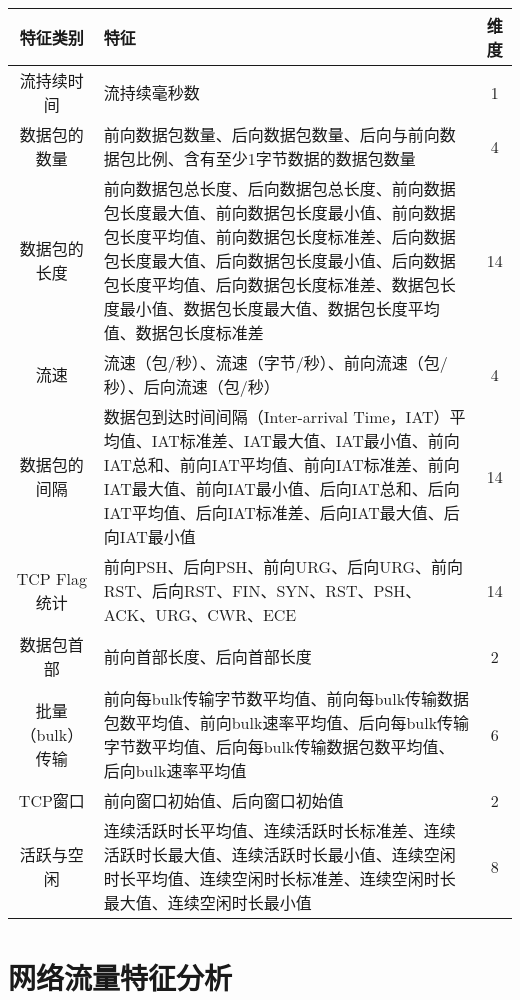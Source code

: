 {\begin{table}[t]
    \label{tab:dataset-features}
    \centering
    \footnotesize%
    \setlength{\tabcolsep}{4pt}%
    \renewcommand{\arraystretch}{1.2}%
    \begin{tabular}{cp{10cm}c}
        \hline
        特征类别 & \centering 特征 & 维度\\
        \hline
        流持续时间 & 流持续毫秒数 & 1\\
        数据包的数量 & 前向数据包数量、后向数据包数量、后向与前向数据包比例、含有至少1字节数据的数据包数量 & 4\\
        数据包的长度 & 前向数据包总长度、后向数据包总长度、前向数据包长度最大值、前向数据包长度最小值、前向数据包长度平均值、前向数据包长度标准差、后向数据包长度最大值、后向数据包长度最小值、后向数据包长度平均值、后向数据包长度标准差、数据包长度最小值、数据包长度最大值、数据包长度平均值、数据包长度标准差 & 14\\
        流速 & 流速（包/秒）、流速（字节/秒）、前向流速（包/秒）、后向流速（包/秒）& 4\\
        数据包的间隔 & 数据包到达时间间隔（Inter-arrival Time，IAT）平均值、IAT标准差、IAT最大值、IAT最小值、前向IAT总和、前向IAT平均值、前向IAT标准差、前向IAT最大值、前向IAT最小值、后向IAT总和、后向IAT平均值、后向IAT标准差、后向IAT最大值、后向IAT最小值 & 14\\
        TCP Flag统计 & 前向PSH、后向PSH、前向URG、后向URG、前向RST、后向RST、FIN、SYN、RST、PSH、ACK、URG、CWR、ECE & 14\\
        数据包首部 & 前向首部长度、后向首部长度 & 2\\
        批量（bulk）传输 & 前向每bulk传输字节数平均值、前向每bulk传输数据包数平均值、前向bulk速率平均值、后向每bulk传输字节数平均值、后向每bulk传输数据包数平均值、后向bulk速率平均值 & 6\\
        TCP窗口 & 前向窗口初始值、后向窗口初始值 & 2\\
        活跃与空闲 & 连续活跃时长平均值、连续活跃时长标准差、连续活跃时长最大值、连续活跃时长最小值、连续空闲时长平均值、连续空闲时长标准差、连续空闲时长最大值、连续空闲时长最小值 & 8\\
        \hline
    \end{tabular}
\end{table}

\section{网络流量特征分析}
\label{sec:analyze}

}
